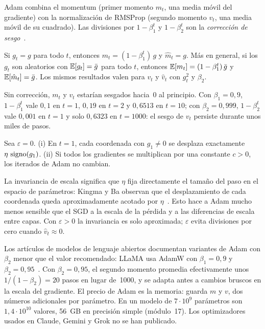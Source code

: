 Adam combina el momentum (primer momento $m_t$, una media móvil del gradiente) con la normalización de RMSProp (segundo momento $v_t$, una media móvil de su cuadrado). Las divisiones por $1-\beta_1^{t}$ y $1-\beta_2^{t}$ son la \emph{corrección de sesgo}~\cite[§3]{adam}.

\begin{proposicion}\label{prop:sesgo}
Si $g_t=g$ para todo $t$, entonces $m_t=(1-\beta_1^{t})\,g$ y $\hat m_t=g$. Más en general, si los $g_t$ son aleatorios con $\mathbb{E}[g_t]=\bar g$ para todo $t$, entonces $\mathbb{E}[m_t]=(1-\beta_1^{t})\,\bar g$ y $\mathbb{E}[\hat m_t]=\bar g$. Los mismos resultados valen para $v_t$ y $\hat v_t$ con $g_t^{2}$ y $\beta_2$.
\end{proposicion}

Sin corrección, $m_t$ y $v_t$ estarían sesgados hacia~0 al principio. Con $\beta_1=0{,}9$, $1-\beta_1^{t}$ vale $0{,}1$ en $t=1$, $0{,}19$ en $t=2$ y $0{,}6513$ en $t=10$; con $\beta_2=0{,}999$, $1-\beta_2^{t}$ vale $0{,}001$ en $t=1$ y solo $0{,}6323$ en $t=1000$: el sesgo de $v_t$ persiste durante unos miles de pasos.

\begin{proposicion}\label{prop:escala}
Sea $\varepsilon=0$. (i) En $t=1$, cada coordenada con $g_1\ne 0$ se desplaza exactamente $\eta\,\operatorname{signo}(g_1)$. (ii) Si todos los gradientes se multiplican por una constante $c>0$, los iterados de Adam no cambian.
\end{proposicion}

La invariancia de escala significa que $\eta$ fija directamente el tamaño del paso en el espacio de parámetros: Kingma y Ba observan que el desplazamiento de cada coordenada queda aproximadamente acotado por $\eta$~\cite[§2.1]{adam}. Esto hace a Adam mucho menos sensible que el SGD a la escala de la pérdida y a las diferencias de escala entre capas. Con $\varepsilon>0$ la invariancia es solo aproximada; $\varepsilon$ evita divisiones por cero cuando $\hat v_t\approx 0$.

\addtocounter{definicion}{1}%

\addtocounter{figure}{1}%

\begin{observacion}
Los artículos de modelos de lenguaje abiertos documentan variantes de Adam con $\beta_2$ menor que el valor recomendado: LLaMA usa AdamW con $\beta_1=0{,}9$ y $\beta_2=0{,}95$~\cite[§2.3]{llama}. Con $\beta_2=0{,}95$, el segundo momento promedia efectivamente unos $1/(1-\beta_2)=20$ pasos en lugar de~1000, y se adapta antes a cambios bruscos en la escala del gradiente. El precio de Adam es la memoria: guarda $m$ y $v$, dos números adicionales por parámetro. En un modelo de $7\cdot 10^{9}$ parámetros son $1{,}4\cdot 10^{10}$ valores, 56~GB en precisión simple (módulo~17). Los optimizadores usados en Claude, Gemini y Grok no se han publicado.
\end{observacion}

